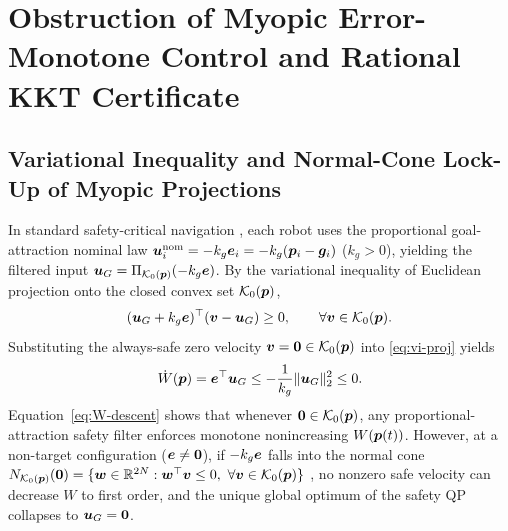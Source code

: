 \section{Obstruction of Myopic Error-Monotone Control and Rational KKT Certificate}\label{sec:obstruction}

\subsection{Variational Inequality and Normal-Cone Lock-Up of Myopic Projections}
In standard safety-critical navigation \cite{ames2017cbf,reis2021}, each robot uses the proportional goal-attraction nominal law $\boldsymbol{u}_i^{\mathrm{nom}}=-k_g\boldsymbol{e}_i=-k_g(\boldsymbol{p}_i-\boldsymbol{g}_i)$ ($k_g>0$), yielding the filtered input $\boldsymbol{u}_G=\Pi_{\mathcal K_0(\boldsymbol{p})}(-k_g\boldsymbol{e})$. By the variational inequality of Euclidean projection onto the closed convex set $\mathcal K_0(\boldsymbol{p})$,
\begin{equation}
 (\boldsymbol{u}_G+k_g\boldsymbol{e})^{\top}(\boldsymbol v-\boldsymbol{u}_G)\ge 0,\qquad\forall\boldsymbol v\in\mathcal K_0(\boldsymbol{p}).
 \label{eq:vi-proj}
\end{equation}
Substituting the always-safe zero velocity $\boldsymbol v=\boldsymbol 0\in\mathcal K_0(\boldsymbol{p})$ into \eqref{eq:vi-proj} yields
\begin{equation}
 \dot W(\boldsymbol{p})=\boldsymbol{e}^{\top}\boldsymbol{u}_G\le -\frac{1}{k_g}\lVert\boldsymbol{u}_G\rVert_2^2\le 0.
 \label{eq:W-descent}
\end{equation}
Equation~\eqref{eq:W-descent} shows that whenever $\boldsymbol 0\in\mathcal K_0(\boldsymbol{p})$, any proportional-attraction safety filter enforces monotone nonincreasing $W(\boldsymbol{p}(t))$. However, at a non-target configuration ($\boldsymbol{e}\ne\boldsymbol 0$), if $-k_g\boldsymbol{e}$ falls into the normal cone $N_{\mathcal K_0(\boldsymbol{p})}(\boldsymbol 0)=\{\boldsymbol w\in\mathbb R^{2N}:\boldsymbol w^{\top}\boldsymbol v\le 0,\ \forall\boldsymbol v\in\mathcal K_0(\boldsymbol{p})\}$ \cite{rockafellar1970}, no nonzero safe velocity can decrease $W$ to first order, and the unique global optimum of the safety QP collapses to $\boldsymbol{u}_G=\boldsymbol 0$.

